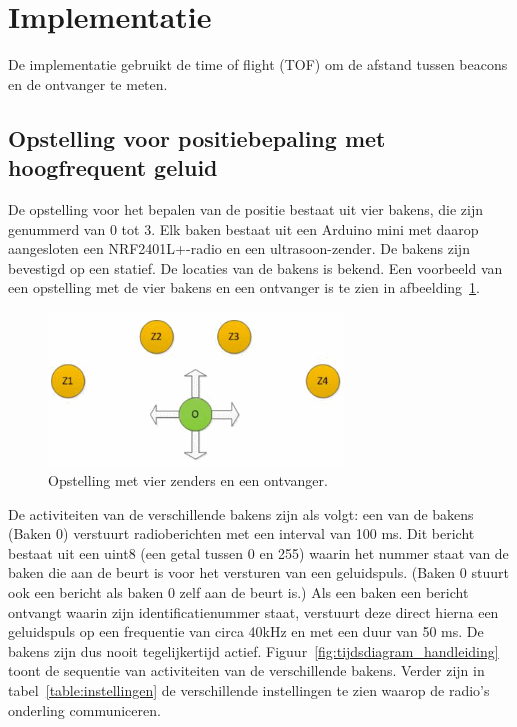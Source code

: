 \documentclass[a4paper,10pt]{article}
\begin{document}
\section{Implementatie}\label{sec:implementatie}
De implementatie gebruikt de time of flight (TOF) om de afstand tussen beacons en de ontvanger te meten.

\subsection{Opstelling voor positiebepaling met hoogfrequent geluid}
De opstelling voor het bepalen van de positie bestaat uit vier bakens, die zijn genummerd van 0 tot 3. Elk baken bestaat uit een Arduino mini met daarop aangesloten een NRF2401L+-radio en een ultrasoon-zender. De bakens zijn bevestigd op een statief. De locaties van de bakens is bekend. Een voorbeeld van een opstelling met de vier bakens en een ontvanger is te zien in afbeelding~\ref{fig:opstelling}.

\begin{figure}[ht!]
    \centering
    \includegraphics[width=0.7\textwidth]{opstelling.png}
    \caption{Opstelling met vier zenders en een ontvanger.}
    \label{fig:opstelling}
\end{figure}

De activiteiten van de verschillende bakens zijn als volgt: een van de bakens (Baken 0) verstuurt radioberichten met een interval van 100 ms. Dit bericht bestaat uit een uint8 (een getal tussen 0 en 255) waarin het nummer staat van de baken die aan de beurt is voor het versturen van een geluidspuls. (Baken 0 stuurt ook een bericht als baken 0 zelf aan de beurt is.) Als een baken een bericht ontvangt waarin zijn identiﬁcatienummer staat, verstuurt deze direct hierna een geluidspuls op een frequentie van circa 40kHz en met een duur van 50 ms. De bakens zijn dus nooit tegelijkertijd actief. Figuur~\ref{fig:tijdsdiagram_handleiding} toont de sequentie van activiteiten van de verschillende bakens. Verder zijn in tabel~\ref{table:instellingen} de verschillende instellingen te zien waarop de radio’s onderling communiceren.
\end{document}
